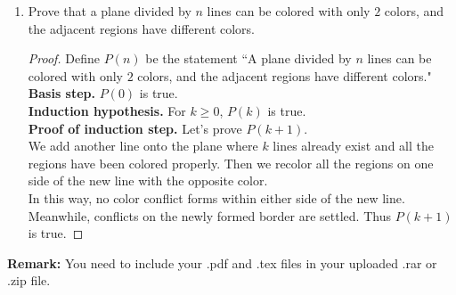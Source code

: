 \documentclass[12pt,a4paper]{article}
\theoremstyle{definition}
\begin{document}
\begin{enumerate}
	    \item
	    Prove that a plane divided by $n$ lines can be colored with only $2$ colors, and the adjacent regions have different colors.
	    \begin{proof}
	    	\hfill \break
	    	Define $P(n)$ be the statement ``A plane divided by $n$ lines can be colored with only $2$ colors, and the adjacent regions have different colors." \\
	    	\textbf{Basis step.} $P(0)$ is true. \\
	    	\textbf{Induction hypothesis.} For $k \geq 0$, $P(k)$ is true. \\
	    	\textbf{Proof of induction step.} Let's prove $P(k + 1)$. \\
	    	We add another line onto the plane where $k$ lines already exist and all the regions have been colored properly. Then we recolor all the regions on one side of the new line with the opposite color. \\
	    	In this way, no color conflict forms within either side of the new line. Meanwhile, conflicts on the newly formed border are settled. 
	    	Thus $P(k + 1)$ is true. 
	    \end{proof}
	
	\end{enumerate}
	
	\vspace{20pt}
	
	\textbf{Remark:} You need to include your .pdf and .tex files in your uploaded .rar or .zip file.
	
\end{document}
